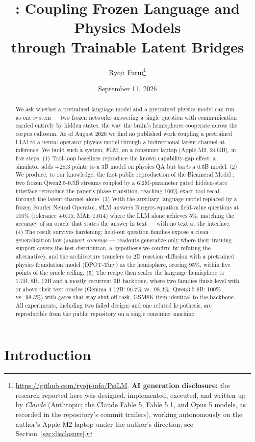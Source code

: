 \documentclass[11pt]{article}
\title{\psilm: Coupling Frozen Language and Physics Models\\through Trainable Latent Bridges}
\author{Ryoji Furui\thanks{\url{https://github.com/ryoji-info/PsiLM}. \textbf{AI generation disclosure:} the research reported here was designed, implemented, executed, and written up by \emph{Claude} (Anthropic; the Claude Fable 5, Fable 5.1, and Opus 5 models, as recorded in the repository's commit trailers), working autonomously on the author's Apple M2 laptop under the author's direction; see Section~\ref{sec:disclosure}.}}
\date{September 11, 2026}
\newcommand{\psilm}{$\Psi$LM}
\begin{document}
\maketitle

\begin{abstract}
We ask whether a pretrained language model and a pretrained physics model can run as one system --- two frozen networks answering a single question with communication carried entirely by hidden states, the way the brain's hemispheres cooperate across the corpus callosum. As of August 2026 we find no published work coupling a pretrained LLM to a neural-operator physics model through a bidirectional latent channel at inference. We build such a system, \psilm{}, on a consumer laptop (Apple M2, 24\,GB), in five steps. (1) Tool-loop baselines reproduce the known capability-gap effect: a simulator adds $+28.3$ points to a 3B model on physics QA but \emph{hurts} a 0.5B model. (2) We produce, to our knowledge, the first public reproduction of the Bicameral Model \citep{flamant2026bicameral}: two frozen Qwen2.5-0.5B streams coupled by a 6.2M-parameter gated hidden-state interface reproduce the paper's phase transition, reaching 100\% exact tool recall through the latent channel alone. (3) With the auxiliary language model replaced by a frozen Fourier Neural Operator, \psilm{} answers Burgers-equation field-value questions at 100\% (tolerance $\pm 0.05$; MAE 0.014) where the LLM alone achieves 5\%, matching the accuracy of an oracle that states the answer in text --- with no text at the interface. (4) The result survives hardening: held-out question families expose a clean generalization law (\emph{support coverage} --- readouts generalize only where their training support covers the test distribution, a hypothesis we confirm by refuting the alternative), and the architecture transfers to 2D reaction--diffusion with a pretrained physics foundation model (DPOT-Tiny) as the hemisphere, scoring 95\%, within five points of the oracle ceiling. (5) The recipe then scales the language hemisphere to 1.7B, 8B, 12B and a mostly recurrent 9B backbone, where two families finish level with or above their text oracles (Gemma 4 12B: 96.7\% vs.\ 98.3\%; Qwen3.5 9B: 100\% vs.\ 98.3\%) with gates that stay shut off-task, GSM8K item-identical to the backbone. All experiments, including two failed designs and one refuted hypothesis, are reproducible from the public repository on a single consumer machine.
\end{abstract}

\section{Introduction}
\label{sec:intro}
\end{document}
